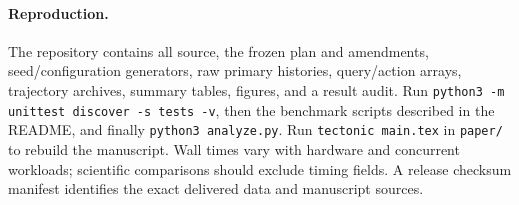 \documentclass{l4dc2026}
\begin{document}
\paragraph{Reproduction.}
The repository contains all source, the frozen plan and amendments, seed/configuration generators, raw primary histories, query/action arrays, trajectory archives, summary tables, figures, and a result audit. Run \texttt{python3 -m unittest discover -s tests -v}, then the benchmark scripts described in the README, and finally \texttt{python3 analyze.py}. Run \texttt{tectonic main.tex} in \texttt{paper/} to rebuild the manuscript. Wall times vary with hardware and concurrent workloads; scientific comparisons should exclude timing fields. A release checksum manifest identifies the exact delivered data and manuscript sources.
\end{document}
